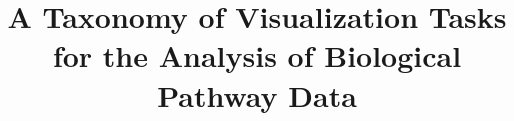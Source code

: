 \documentclass[twocolumn]{bmcart}%
\begin{document}
\begin{frontmatter}

\begin{fmbox}


\title{A Taxonomy of Visualization Tasks for the Analysis of Biological Pathway Data}

\author[
addressref={aff1},
email={pmurra5@uic.edu}
]{ }
\author[
addressref={aff2},
email={fintan.mcgee@list.lu}
]{ }
\author[
addressref={aff1},
email={aforbes@uic.edu}
]{ }

\address[id=aff1]{
}
\address[id=aff2]{
}





\begin{artnotes}
\end{artnotes}


\end{fmbox}
\end{frontmatter}
\end{document}
